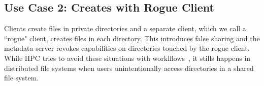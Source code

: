 %
%
%
%
%
%
%
%
%
%
%

\subsection{Use Case 2: Creates with Rogue Client}

Clients create files in private directories and a separate client, which we
call a ``rogue" client, creates files in each directory. This introduces false
sharing and the metadata server revokes capabilities on directories touched by
the rogue client. While HPC tries to avoid these situations with
worklflows~\cite{zheng:pdsw2014-batchfs, zheng:pdsw2015-deltafs}, it stills
happens in distributed file systems when users unintentionally access
directories in a shared file system.

